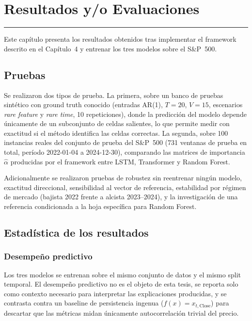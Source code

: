 \chapter{Resultados y/o Evaluaciones}
\hrule \bigskip \vspace*{1cm}
\label{chap:resultados}

Este capítulo presenta los resultados obtenidos tras implementar el framework descrito en el Capítulo~4 y entrenar los tres modelos sobre el S\&P~500.

\section{Pruebas}

Se realizaron dos tipos de prueba. La primera, sobre un banco de pruebas sintético con ground truth conocido (entradas AR(1), $T{=}20$, $V{=}15$, escenarios \emph{rare feature} y \emph{rare time}, 10 repeticiones), donde la predicción del modelo depende únicamente de un subconjunto de celdas salientes, lo que permite medir con exactitud si el método identifica las celdas correctas. La segunda, sobre 100 instancias reales del conjunto de prueba del S\&P~500 (731 ventanas de prueba en total, período 2022-01-04 a 2024-12-30), comparando las matrices de importancia $\hat{\alpha}$ producidas por el framework entre LSTM, Transformer y Random Forest.

Adicionalmente se realizaron pruebas de robustez sin reentrenar ningún modelo, exactitud direccional, sensibilidad al vector de referencia, estabilidad por régimen de mercado (bajista 2022 frente a alcista 2023--2024), y la investigación de una referencia condicionada a la hoja específica para Random Forest.

\section{Estadística de los resultados}

\subsection{Desempeño predictivo}

Los tres modelos se entrenan sobre el mismo conjunto de datos y el mismo split temporal. El desempeño predictivo no es el objeto de esta tesis, se reporta solo como contexto necesario para interpretar las explicaciones producidas, y se contrasta contra un baseline de persistencia ingenua ($f(x)=x_{t,\text{Close}}$) para descartar que las métricas midan únicamente autocorrelación trivial del precio.

